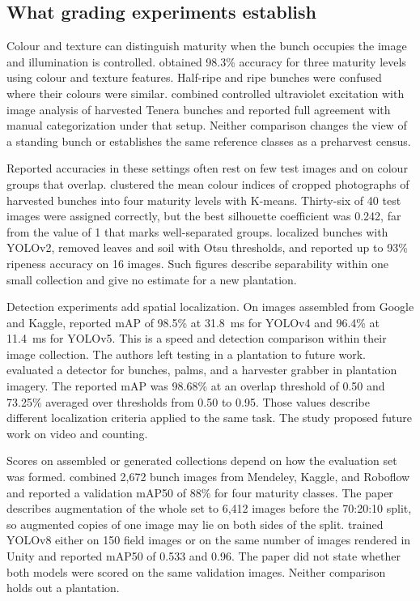 \subsection{What grading experiments establish}

Colour and texture can distinguish maturity when the bunch occupies the image and illumination is controlled. \citet{septiarini2021machine} obtained 98.3\% accuracy for three maturity levels using colour and texture features. Half-ripe and ripe bunches were confused where their colours were similar. \citet{phimpisan2023real} combined controlled ultraviolet excitation with image analysis of harvested Tenera bunches and reported full agreement with manual categorization under that setup. Neither comparison changes the view of a standing bunch or establishes the same reference classes as a preharvest census.

Reported accuracies in these settings often rest on few test images and on colour groups that overlap. \citet{sari2023ripeness} clustered the mean colour indices of cropped photographs of harvested bunches into four maturity levels with K-means. Thirty-six of 40 test images were assigned correctly, but the best silhouette coefficient was 0.242, far from the value of 1 that marks well-separated groups. \citet{rosbi2025segmentation} localized bunches with YOLOv2, removed leaves and soil with Otsu thresholds, and reported up to 93\% ripeness accuracy on 16 images. Such figures describe separability within one small collection and give no estimate for a new plantation.

Detection experiments add spatial localization. On images assembled from Google and Kaggle, \citet{chen2022detection} reported mAP of 98.5\% at 31.8~ms for YOLOv4 and 96.4\% at 11.4~ms for YOLOv5. This is a speed and detection comparison within their image collection. The authors left testing in a plantation to future work. \citet{junos2021optimized} evaluated a detector for bunches, palms, and a harvester grabber in plantation imagery. The reported mAP was 98.68\% at an overlap threshold of 0.50 and 73.25\% averaged over thresholds from 0.50 to 0.95. Those values describe different localization criteria applied to the same task. The study proposed future work on video and counting.

Scores on assembled or generated collections depend on how the evaluation set was formed. \citet{dahlan2026detecting} combined 2,672 bunch images from Mendeley, Kaggle, and Roboflow and reported a validation mAP50 of 88\% for four maturity classes. The paper describes augmentation of the whole set to 6,412 images before the 70:20:10 split, so augmented copies of one image may lie on both sides of the split. \citet{goh2024synthetic} trained YOLOv8 either on 150 field images or on the same number of images rendered in Unity and reported mAP50 of 0.533 and 0.96. The paper did not state whether both models were scored on the same validation images. Neither comparison holds out a plantation.


